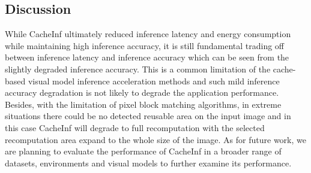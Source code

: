 \subsection{Discussion}
While CacheInf ultimately reduced inference latency and energy consumption while maintaining high inference accuracy, it is still fundamental trading off between inference latency and inference accuracy which can be seen from the slightly degraded inference accuracy.
This is a common limitation of the cache-based visual model inference acceleration methods and such mild inference accuracy degradation is not likely to degrade the application performance.
Besides, with the limitation of pixel block matching algorithms, in extreme situations there could be no detected reusable area on the input image and in this case CacheInf will degrade to full recomputation with the selected recomputation area expand to the whole size of the image.
As for future work, we are planning to evaluate the performance of CacheInf in a broader range of datasets, environments and visual models to further examine its performance.